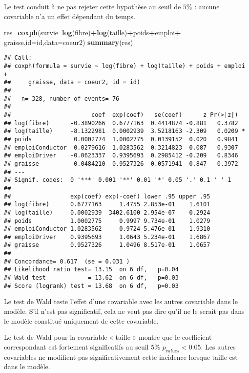 \documentclass[
]{article}
\newenvironment{Shaded}{\begin{snugshade}}{\end{snugshade}}
\newcommand{\DataTypeTok}[1]{\textcolor[rgb]{0.13,0.29,0.53}{#1}}
\newcommand{\KeywordTok}[1]{\textcolor[rgb]{0.13,0.29,0.53}{\textbf{#1}}}
\newcommand{\NormalTok}[1]{#1}
\newcommand{\OperatorTok}[1]{\textcolor[rgb]{0.81,0.36,0.00}{\textbf{#1}}}
\newcommand{\StringTok}[1]{\textcolor[rgb]{0.31,0.60,0.02}{#1}}
\begin{document}
Le test conduit à ne pas rejeter cette hypothèse au seuil de \(5\%\) :
aucune covariable n'a un effet dépendant du temps.

\begin{Shaded}
\begin{Highlighting}[]
\NormalTok{ res=}\KeywordTok{coxph}\NormalTok{(survie}\OperatorTok{~}\KeywordTok{log}\NormalTok{(fibre)}\OperatorTok{+}\KeywordTok{log}\NormalTok{(taille)}\OperatorTok{+}\NormalTok{poids}\OperatorTok{+}\NormalTok{emploi}\OperatorTok{+}
\StringTok{             }\NormalTok{graisse,}\DataTypeTok{id=}\NormalTok{id,}\DataTypeTok{data=}\NormalTok{coeur2)}
 \KeywordTok{summary}\NormalTok{(res)}
\end{Highlighting}
\end{Shaded}

\begin{verbatim}
## Call:
## coxph(formula = survie ~ log(fibre) + log(taille) + poids + emploi + 
##     graisse, data = coeur2, id = id)
## 
##   n= 328, number of events= 76 
## 
##                       coef  exp(coef)   se(coef)      z Pr(>|z|)  
## log(fibre)      -0.3890266  0.6777163  0.4414874 -0.881   0.3782  
## log(taille)     -8.1322981  0.0002939  3.5218163 -2.309   0.0209 *
## poids            0.0002774  1.0002775  0.0139152  0.020   0.9841  
## emploiConductor  0.0279616  1.0283562  0.3214823  0.087   0.9307  
## emploiDriver    -0.0623337  0.9395693  0.2985412 -0.209   0.8346  
## graisse         -0.0484210  0.9527326  0.0571941 -0.847   0.3972  
## ---
## Signif. codes:  0 '***' 0.001 '**' 0.01 '*' 0.05 '.' 0.1 ' ' 1
## 
##                 exp(coef) exp(-coef) lower .95 upper .95
## log(fibre)      0.6777163     1.4755 2.853e-01    1.6101
## log(taille)     0.0002939  3402.6100 2.954e-07    0.2924
## poids           1.0002775     0.9997 9.734e-01    1.0279
## emploiConductor 1.0283562     0.9724 5.476e-01    1.9310
## emploiDriver    0.9395693     1.0643 5.234e-01    1.6867
## graisse         0.9527326     1.0496 8.517e-01    1.0657
## 
## Concordance= 0.617  (se = 0.031 )
## Likelihood ratio test= 13.15  on 6 df,   p=0.04
## Wald test            = 13.62  on 6 df,   p=0.03
## Score (logrank) test = 13.68  on 6 df,   p=0.03
\end{verbatim}

Le test de Wald teste l'effet d'une covariable avec les autres
covariable dans le modèle. S'il n'est pas significatif, cela ne veut pas
dire qu'il ne le serait pas dans le modèle constitué uniquement de cette
covariable.

Le test de Wald pour la covariable « taille » montre que le coefficient
correspondant est fortement significatifs au seuil \(5\%\)
\(p_{values} < 0.05\). Les autres covariables ne modifient pas
significativement cette incidence lorsque taille est dans le modèle.
\end{document}
